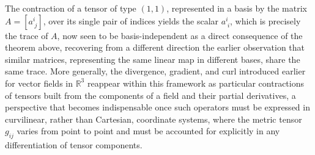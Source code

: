 The contraction of a tensor of type $(1,1)$, represented in a basis by the matrix $A = [a^i_{\;j}]$, over its single pair of indices yields the scalar $a^i_{\;i}$, which is precisely the trace of $A$, now seen to be basis-independent as a direct consequence of the theorem above, recovering from a different direction the earlier observation that similar matrices, representing the same linear map in different bases, share the same trace. More generally, the divergence, gradient, and curl introduced earlier for vector fields in $\mathbb{R}^3$ reappear within this framework as particular contractions of tensors built from the components of a field and their partial derivatives, a perspective that becomes indispensable once such operators must be expressed in curvilinear, rather than Cartesian, coordinate systems, where the metric tensor $g_{ij}$ varies from point to point and must be accounted for explicitly in any differentiation of tensor components.
